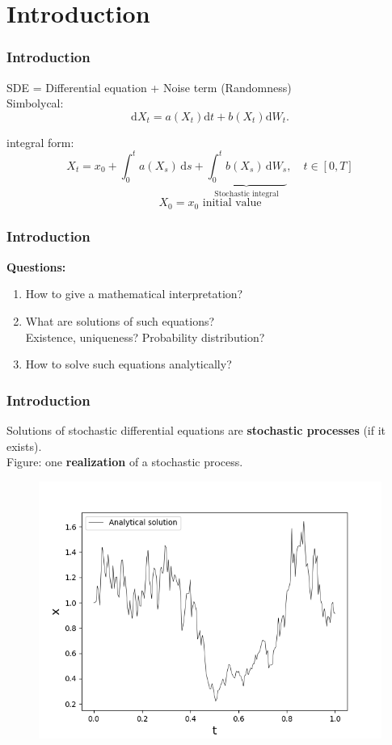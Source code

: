 \section{Introduction} 

\begin{frame}
\frametitle{Introduction}
SDE = Differential equation + Noise term (Randomness)\\
Simbolycal:
\[\mathrm{d}X_t = a(X_t)\mathrm{d}t + b(X_t)\mathrm{d}W_t.\]

integral form:
\[X_t = x_0 + \int_0^t \!a(X_s)\,\mathrm{d}s + \underbrace{\int_0^t \!b(X_s)\,\mathrm{d}W_{s}}_{\text{Stochastic integral}},\quad t\in [0,T]\]
\[X_0 = x_0\,\,\text{initial value}\]
\end{frame}




\begin{frame}
\frametitle{Introduction}
\textbf{Questions:}
\begin{enumerate}
\item How to give a mathematical interpretation? 
\item What are solutions of such equations?\\ 
Existence, uniqueness? Probability distribution?
\item How to solve such equations analytically?
\end{enumerate}
\end{frame}

\begin{frame}
\frametitle{Introduction}
Solutions of stochastic differential equations are \textbf{stochastic processes}  (if it exists).\\
Figure: one \textbf{realization} of a stochastic process.
\begin{figure}
\includegraphics[width=0.6\linewidth]{Content/Graphics/slides/AnalyticalSolution}
\end{figure}
\end{frame}



